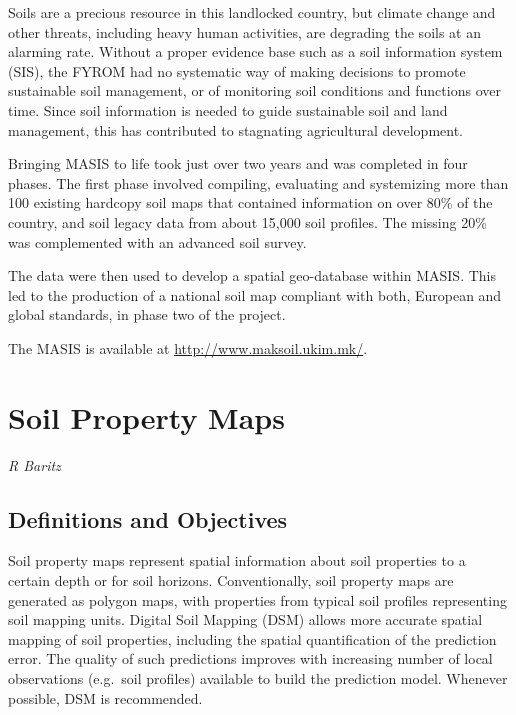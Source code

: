 \documentclass[10pt,b5paper,]{book}
\theoremstyle{definition}
\theoremstyle{definition}
\theoremstyle{definition}
\theoremstyle{remark}
\begin{document}
Soils are a precious resource in this landlocked country, but climate
change and other threats, including heavy human activities, are
degrading the soils at an alarming rate. Without a proper evidence base
such as a soil information system (SIS), the FYROM had no systematic way
of making decisions to promote sustainable soil management, or of
monitoring soil conditions and functions over time. Since soil
information is needed to guide sustainable soil and land management,
this has contributed to stagnating agricultural development.

Bringing MASIS to life took just over two years and was completed in
four phases. The first phase involved compiling, evaluating and
systemizing more than 100 existing hardcopy soil maps that contained
information on over 80\% of the country, and soil legacy data from about
15,000 soil profiles. The missing 20\% was complemented with an advanced
soil survey.

The data were then used to develop a spatial geo-database within MASIS.
This led to the production of a national soil map compliant with both,
European and global standards, in phase two of the project.

The MASIS is available at \url{http://www.maksoil.ukim.mk/}.

\hypertarget{soil-property-maps}{%
\chapter{Soil Property Maps}\label{soil-property-maps}}

\emph{R Baritz}

\hypertarget{definitions-and-objectives}{%
\section{Definitions and Objectives}\label{definitions-and-objectives}}

Soil property maps represent spatial information about soil properties
to a certain depth or for soil horizons. Conventionally, soil property
maps are generated as polygon maps, with properties from typical soil
profiles representing soil mapping units. Digital Soil Mapping (DSM)
allows more accurate spatial mapping of soil properties, including the
spatial quantification of the prediction error. The quality of such
predictions improves with increasing number of local observations
(e.g.~soil profiles) available to build the prediction model. Whenever
possible, DSM is recommended.
\end{document}
